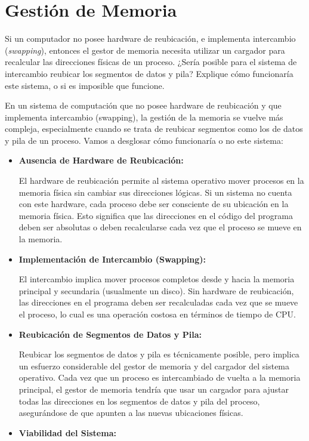 \section{Gestión de Memoria}

\begin{ejercicio}
Si un computador no posee hardware de reubicación, e implementa intercambio (\textit{swapping}), entonces el gestor de memoria necesita utilizar un cargador para recalcular las direcciones físicas de un proceso. ¿Sería posible para el sistema de intercambio reubicar los segmentos de datos y pila? Explique cómo funcionaría este sistema, o si es imposible que funcione.

En un sistema de computación que no posee hardware de reubicación y que implementa intercambio (swapping), la gestión de la memoria se vuelve más compleja, especialmente cuando se trata de reubicar segmentos como los de datos y pila de un proceso. Vamos a desglosar cómo funcionaría o no este sistema:
\begin{itemize}
    \item \textbf{Ausencia de Hardware de Reubicación:}
    
    El hardware de reubicación permite al sistema operativo mover procesos en la memoria física sin cambiar sus direcciones lógicas. Si un sistema no cuenta con este hardware, cada proceso debe ser consciente de su ubicación en la memoria física. Esto significa que las direcciones en el código del programa deben ser absolutas o deben recalcularse cada vez que el proceso se mueve en la memoria.
    \item \textbf{Implementación de Intercambio (Swapping):}
    
    El intercambio implica mover procesos completos desde y hacia la memoria principal y secundaria (usualmente un disco). Sin hardware de reubicación, las direcciones en el programa deben ser recalculadas cada vez que se mueve el proceso, lo cual es una operación costosa en términos de tiempo de CPU.
    \item \textbf{Reubicación de Segmentos de Datos y Pila:}
    
    Reubicar los segmentos de datos y pila es técnicamente posible, pero implica un esfuerzo considerable del gestor de memoria y del cargador del sistema operativo. Cada vez que un proceso es intercambiado de vuelta a la memoria principal, el gestor de memoria tendría que usar un cargador para ajustar todas las direcciones en los segmentos de datos y pila del proceso, asegurándose de que apunten a las nuevas ubicaciones físicas.
    \item \textbf{Viabilidad del Sistema:}
    

\end{itemize}
\end{ejercicio}
